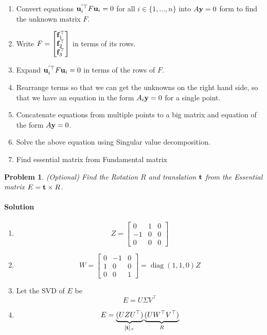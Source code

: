 \documentclass[times,singlecolumn]{article}
\newtheorem{prob}{Problem}
\DeclareMathOperator{\diag}{diag}
\begin{document}
\begin{enumerate}
  \item Convert equations $\mathbf{u}_i^{'\top} F \mathbf{u}_i = 0$ for all $i \in \{1, \dots,
    n\}$ into $A\mathbf{y} = 0$ form to find the unknown matrix $F$.
    \vspace{10em}
  \item Write $F = \begin{bmatrix} \mathbf{f}_1^\top \\ \mathbf{f}_2^\top \\ \mathbf{f}_3^\top\end{bmatrix}$ in terms of its rows.
    \vspace{10em}

  \item Expand $\mathbf{u}_i^{'\top} F\mathbf{u}_i = 0$  in terms of the rows of $F$.
    \vspace{10em}
  \item Rearrange terms so that we can get the unknowns on the right hand side,
    so that we have an equation in the form $A_i \mathbf{y} = 0$ for a single point.
    \vspace{10em}
  \item Concatenate equations from multiple points to a big matrix and equation
    of the form $A \mathbf{y} = 0$.
    \vspace{10em}
  \item Solve the above equation using Singular value decomposition.
    \vspace{10em}
  \item Find essential matrix from Fundamental matrix
    \vspace{10em}

\end{enumerate}

\begin{prob}
  (Optional) Find the Rotation $R$ and translation $\mathbf{t}$ from the Essential matrix $E =
  \mathbf{t} \times R$.
\end{prob}
\paragraph{Solution}
\begin{enumerate}
  
\item \[ Z = \begin{bmatrix} 0 & 1 & 0 \\ -1 & 0 & 0 \\ 0 & 0 & 0\end{bmatrix} \]
\item \[ W = \begin{bmatrix} 0 & -1 & 0 \\ 1 & 0 & 0 \\ 0 & 0 & 1\end{bmatrix}
    = \diag(1, 1, 0) Z \]
\item Let the SVD of $E$ be \[ E = U\Sigma V^\top \]
\item \[ E = \underbrace{(UZU^\top)}_{[\mathbf{t}]_\times} \underbrace{(UW^\top V^\top)}_{R}  \]
\end{enumerate}
\end{document}

